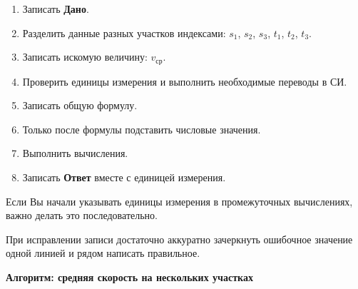 \documentclass[a4paper,12pt]{article}
\newcommand{\avgv}{v_{\text{ср}}}
\begin{document}
\begin{enumerate}

\item
Записать \textbf{Дано}.

\item
Разделить данные разных участков индексами:
$s_1$, $s_2$, $s_3$, $t_1$, $t_2$, $t_3$.

\item
Записать искомую величину:
$\avgv$.

\item
Проверить единицы измерения и выполнить необходимые переводы в СИ.

\item
Записать общую формулу.

\item
Только после формулы подставить числовые значения.

\item
Выполнить вычисления.

\item
Записать \textbf{Ответ} вместе с единицей измерения.

\end{enumerate}

Если Вы начали указывать единицы измерения в промежуточных вычислениях, важно делать это последовательно.

При исправлении записи достаточно аккуратно зачеркнуть ошибочное значение одной линией и рядом написать правильное.


\clearpage
\thispagestyle{empty}

\begin{center}
{\Large\bfseries\color{darkaccent}
Алгоритм: средняя скорость на нескольких участках}
\end{center}

\vspace{8mm}
\end{document}
